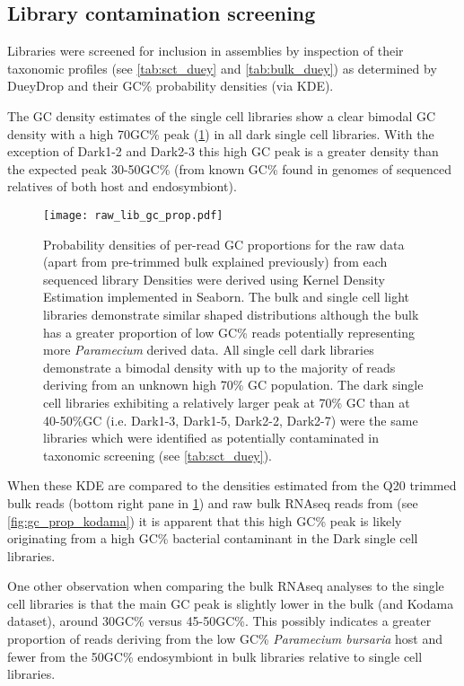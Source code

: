 \subsection{Library contamination screening}

Libraries were screened for inclusion in assemblies by inspection of their taxonomic
profiles (see \cref{tab:sct_duey} and \cref{tab:bulk_duey}) as determined by DueyDrop 
and their GC\% probability densities (via KDE).

The GC density estimates of the single cell libraries show a clear bimodal GC density
with a high 70GC\% peak (\cref{fig:gc_prop_raw}) in all dark single cell libraries. 
With the exception of Dark1-2 and Dark2-3 this high GC peak is a greater density
than the expected peak 30-50GC\% (from known GC\% found in genomes
of sequenced relatives of both host and endosymbiont).

\begin{figure}[h]
    \texttt{[image: raw\_lib\_gc\_prop.pdf]}
    \caption{Probability densities of per-read GC proportions for the raw data (apart from pre-trimmed bulk explained previously)
        from each sequenced library 
        Densities were derived using Kernel Density Estimation implemented in Seaborn. 
        The bulk and single cell light libraries demonstrate similar shaped distributions
        although the bulk has a greater proportion of low GC\% reads potentially representing
        more \textit{Paramecium} derived data. All single cell dark libraries 
        demonstrate a bimodal density with up to the majority of reads deriving 
        from an unknown high 70\% GC population. The dark single cell libraries
        exhibiting a relatively larger peak at 70\% GC than at 40-50\%GC (i.e.
        Dark1-3, Dark1-5, Dark2-2, Dark2-7) were
        the same libraries which were identified as potentially contaminated
        in taxonomic screening (see \cref{tab:sct_duey}).
    }
    \label{fig:gc_prop_raw}
\end{figure}

When these KDE are compared to the densities estimated from the Q20 trimmed
bulk reads (bottom right pane in \cref{fig:gc_prop_raw}) and 
raw bulk RNAseq reads from \citep{Kodama2014} (see \cref{fig:gc_prop_kodama}) 
it is apparent that this high GC\% peak is likely originating from
a high GC\% bacterial contaminant in the Dark single cell libraries.  

One other observation when comparing the bulk RNAseq analyses to the single cell
libraries is that the main GC peak is slightly lower in the bulk (and Kodama dataset), 
around 30GC\% versus 45-50GC\%.
This possibly indicates a greater proportion of reads deriving from the low
GC\% \textit{Paramecium bursaria} host and fewer from the 50GC\% endosymbiont
in bulk libraries relative to single cell libraries.  

